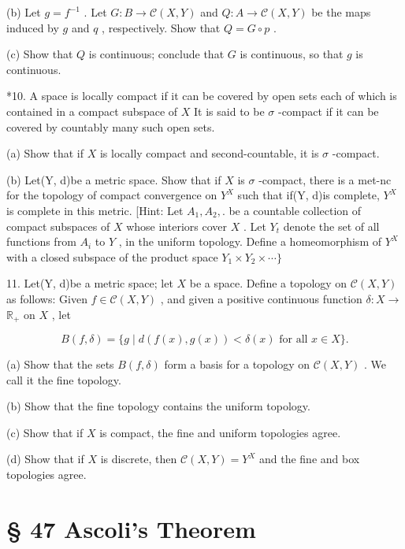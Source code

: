 (b) Let \(g = {f}^{-1}\) . Let \(G : B \rightarrow  \mathcal{C}\left( {X,Y}\right)\) and \(Q : A \rightarrow  \mathcal{C}\left( {X,Y}\right)\) be the maps induced by \(g\) and \(q\) , respectively. Show that \(Q = G \circ  p\) .

(c) Show that \(Q\) is continuous; conclude that \(G\) is continuous, so that \(g\) is continuous.

*10. A space is locally compact if it can be covered by open sets each of which is contained in a compact subspace of \(X\) It is said to be \(\sigma\) -compact if it can be covered by countably many such open sets.

(a) Show that if \(X\) is locally compact and second-countable, it is \(\sigma\) -compact.

(b) Let(Y, d)be a metric space. Show that if \(X\) is \(\sigma\) -compact, there is a met-nc for the topology of compact convergence on \({Y}^{X}\) such that if(Y, d)is complete, \({Y}^{X}\) is complete in this metric. [Hint: Let \({A}_{1},{A}_{2},.\) be a countable collection of compact subspaces of \(X\) whose interiors cover \(X\) . Let \({Y}_{t}\) denote the set of all functions from \({A}_{i}\) to \(Y\) , in the uniform topology. Define a homeomorphism of \({Y}^{X}\) with a closed subspace of the product space \({Y}_{1} \times  {Y}_{2} \times  \cdots \}\)

11. Let(Y, d)be a metric space; let \(X\) be a space. Define a topology on \(\mathcal{C}\left( {X,Y}\right)\) as follows: Given \(f \in  \mathcal{C}\left( {X,Y}\right)\) , and given a positive continuous function \(\delta  : X \rightarrow\)  \({\mathbb{R}}_{ + }\) on \(X\) , let

\[
B\left( {f,\delta }\right)  = \{ g \mid  d\left( {f\left( x\right) ,g\left( x\right) }\right)  < \delta \left( x\right) \text{ for all }x \in  X\} .
\]

(a) Show that the sets \(B\left( {f,\delta }\right)\) form a basis for a topology on \(\mathcal{C}\left( {X,Y}\right)\) . We call it the fine topology.

(b) Show that the fine topology contains the uniform topology.

(c) Show that if \(X\) is compact, the fine and uniform topologies agree.

(d) Show that if \(X\) is discrete, then \(\mathcal{C}\left( {X,Y}\right)  = {Y}^{X}\) and the fine and box topologies agree.

\section*{§ 47 Ascoli’s Theorem}

